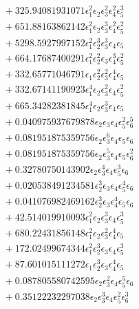 \documentclass[10pt]{article}
\begin{document}
\begin{align*}
&{}  + 325.94081931071 \epsilon_{1}^{2} \epsilon_{2} \epsilon_{3}^{2} \epsilon_{4}^{2} \epsilon_{5}^{3} \\
&{}  + 651.88163862142 \epsilon_{1}^{2} \epsilon_{2} \epsilon_{3}^{3} \epsilon_{4}^{2} \epsilon_{5}^{2} \\
&{}  + 5298.5927997152 \epsilon_{1}^{2} \epsilon_{2}^{3} \epsilon_{3}^{3} \epsilon_{4} \epsilon_{5} \\
&{}  + 664.17687400291 \epsilon_{1}^{2} \epsilon_{2}^{2} \epsilon_{3} \epsilon_{4}^{3} \epsilon_{5}^{2} \\
&{}  + 332.65771046791 \epsilon_{1} \epsilon_{2}^{2} \epsilon_{3}^{2} \epsilon_{4}^{4} \epsilon_{5} \\
&{}  + 332.67141190923 \epsilon_{1}^{4} \epsilon_{2} \epsilon_{3}^{2} \epsilon_{4} \epsilon_{5}^{2} \\
&{}  + 665.34282381845 \epsilon_{1}^{4} \epsilon_{2} \epsilon_{3}^{3} \epsilon_{4} \epsilon_{5} \\
&{}  + 0.040975937679878 \epsilon_{2} \epsilon_{3} \epsilon_{4} \epsilon_{5}^{2} \epsilon_{6}^{5} \\
&{}  + 0.081951875359756 \epsilon_{2} \epsilon_{3}^{6} \epsilon_{4} \epsilon_{5} \epsilon_{6} \\
&{}  + 0.081951875359756 \epsilon_{2} \epsilon_{3}^{5} \epsilon_{4} \epsilon_{5} \epsilon_{6}^{2} \\
&{}  + 0.32780750143902 \epsilon_{2} \epsilon_{3}^{4} \epsilon_{4} \epsilon_{5}^{3} \epsilon_{6} \\
&{}  + 0.020538491234581 \epsilon_{2}^{3} \epsilon_{3} \epsilon_{4} \epsilon_{5}^{4} \epsilon_{6} \\
&{}  + 0.041076982469162 \epsilon_{2}^{3} \epsilon_{3} \epsilon_{4}^{4} \epsilon_{5} \epsilon_{6} \\
&{}  + 42.514019910093 \epsilon_{1}^{2} \epsilon_{2} \epsilon_{3}^{3} \epsilon_{4} \epsilon_{5}^{3} \\
&{}  + 680.22431856148 \epsilon_{1}^{2} \epsilon_{2} \epsilon_{3}^{2} \epsilon_{4}^{4} \epsilon_{5} \\
&{}  + 172.02499674344 \epsilon_{1}^{2} \epsilon_{2}^{3} \epsilon_{3} \epsilon_{4} \epsilon_{5}^{3} \\
&{}  + 87.601015111272 \epsilon_{1} \epsilon_{2}^{3} \epsilon_{3} \epsilon_{4}^{4} \epsilon_{5} \\
&{}  + 0.087805580742595 \epsilon_{2} \epsilon_{3}^{2} \epsilon_{4} \epsilon_{5}^{5} \epsilon_{6} \\
&{}  + 0.35122232297038 \epsilon_{2} \epsilon_{3}^{3} \epsilon_{4} \epsilon_{5}^{2} \epsilon_{6}^{3} \\

\end{align*}
\end{document}
